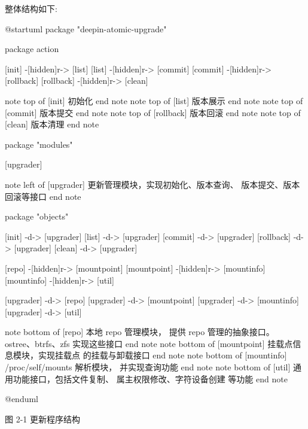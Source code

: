 \documentclass{utart}
\begin{document}
整体结构如下: 
\begin{center}
  \begin{adjustbox}{scale=0.75}
    \begin{plantuml}
      @startuml
      package "deepin-atomic-upgrade" {
        package action {
          [init] -[hidden]r-> [list]
          [list] -[hidden]r-> [commit]
          [commit] -[hidden]r-> [rollback]
          [rollback] -[hidden]r-> [clean]

          note top of [init]
          初始化
          end note
          note top of [list]
          版本展示
          end note
          note top of [commit]
          版本提交
          end note
          note top of [rollback]
          版本回滚
          end note
          note top of [clean]
          版本清理
          end note
        }

        package "modules" {
          [upgrader]

          note left of [upgrader]
          更新管理模块，实现初始化、版本查询、
          版本提交、版本回滚等接口
          end note
        }

        package "objects" {
          [init] -d-> [upgrader]
          [list] -d-> [upgrader]
          [commit] -d-> [upgrader]
          [rollback] -d-> [upgrader]
          [clean] -d-> [upgrader]

          [repo] -[hidden]r-> [mountpoint]
          [mountpoint] -[hidden]r-> [mountinfo]
          [mountinfo] -[hidden]r-> [util]

          [upgrader] -d-> [repo]
          [upgrader] -d-> [mountpoint]
          [upgrader] -d-> [mountinfo]
          [upgrader] -d-> [util]

          note bottom of [repo]
          本地 repo 管理模块，
          提供 repo 管理的抽象接口。
          ostree、btrfs、zfs 实现这些接口
          end note
          note bottom of [mountpoint]
          挂载点信息模块，实现挂载点
          的挂载与卸载接口
          end note
          note bottom of [mountinfo]
          /proc/self/mounts 解析模块，
          并实现查询功能
          end note
          note bottom of [util]
          通用功能接口，包括文件复制、
          属主权限修改、字符设备创建
          等功能
          end note
        }
      }
      @enduml
    \end{plantuml}
  \end{adjustbox}

  图 2-1 更新程序结构
\end{center}
\end{document}
